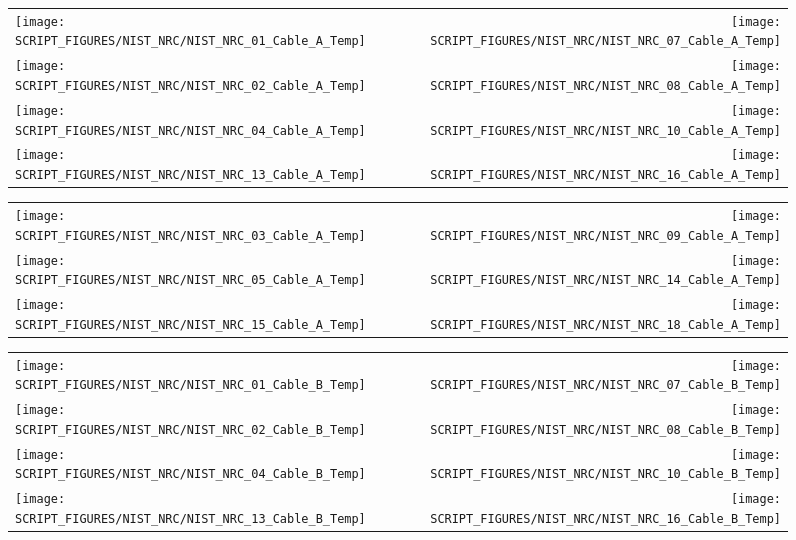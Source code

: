 \newpage

\begin{figure}[p]
\begin{tabular*}{\textwidth}{l@{\extracolsep{\fill}}r}
\texttt{[image: SCRIPT\_FIGURES/NIST\_NRC/NIST\_NRC\_01\_Cable\_A\_Temp]} &
\texttt{[image: SCRIPT\_FIGURES/NIST\_NRC/NIST\_NRC\_07\_Cable\_A\_Temp]} \\
\texttt{[image: SCRIPT\_FIGURES/NIST\_NRC/NIST\_NRC\_02\_Cable\_A\_Temp]} &
\texttt{[image: SCRIPT\_FIGURES/NIST\_NRC/NIST\_NRC\_08\_Cable\_A\_Temp]} \\
\texttt{[image: SCRIPT\_FIGURES/NIST\_NRC/NIST\_NRC\_04\_Cable\_A\_Temp]} &
\texttt{[image: SCRIPT\_FIGURES/NIST\_NRC/NIST\_NRC\_10\_Cable\_A\_Temp]} \\
\texttt{[image: SCRIPT\_FIGURES/NIST\_NRC/NIST\_NRC\_13\_Cable\_A\_Temp]} &
\texttt{[image: SCRIPT\_FIGURES/NIST\_NRC/NIST\_NRC\_16\_Cable\_A\_Temp]}
\end{tabular*}
\label{NIST_NRC_Cable_A_Closed}
\end{figure}

\begin{figure}[p]
\begin{tabular*}{\textwidth}{l@{\extracolsep{\fill}}r}
\texttt{[image: SCRIPT\_FIGURES/NIST\_NRC/NIST\_NRC\_03\_Cable\_A\_Temp]} &
\texttt{[image: SCRIPT\_FIGURES/NIST\_NRC/NIST\_NRC\_09\_Cable\_A\_Temp]} \\
\texttt{[image: SCRIPT\_FIGURES/NIST\_NRC/NIST\_NRC\_05\_Cable\_A\_Temp]} &
\texttt{[image: SCRIPT\_FIGURES/NIST\_NRC/NIST\_NRC\_14\_Cable\_A\_Temp]} \\
\texttt{[image: SCRIPT\_FIGURES/NIST\_NRC/NIST\_NRC\_15\_Cable\_A\_Temp]} &
\texttt{[image: SCRIPT\_FIGURES/NIST\_NRC/NIST\_NRC\_18\_Cable\_A\_Temp]}
\end{tabular*}
\label{NIST_NRC_Cable_A_Open}
\end{figure}

\begin{figure}[p]
\begin{tabular*}{\textwidth}{l@{\extracolsep{\fill}}r}
\texttt{[image: SCRIPT\_FIGURES/NIST\_NRC/NIST\_NRC\_01\_Cable\_B\_Temp]} &
\texttt{[image: SCRIPT\_FIGURES/NIST\_NRC/NIST\_NRC\_07\_Cable\_B\_Temp]} \\
\texttt{[image: SCRIPT\_FIGURES/NIST\_NRC/NIST\_NRC\_02\_Cable\_B\_Temp]} &
\texttt{[image: SCRIPT\_FIGURES/NIST\_NRC/NIST\_NRC\_08\_Cable\_B\_Temp]} \\
\texttt{[image: SCRIPT\_FIGURES/NIST\_NRC/NIST\_NRC\_04\_Cable\_B\_Temp]} &
\texttt{[image: SCRIPT\_FIGURES/NIST\_NRC/NIST\_NRC\_10\_Cable\_B\_Temp]} \\
\texttt{[image: SCRIPT\_FIGURES/NIST\_NRC/NIST\_NRC\_13\_Cable\_B\_Temp]} &
\texttt{[image: SCRIPT\_FIGURES/NIST\_NRC/NIST\_NRC\_16\_Cable\_B\_Temp]}
\end{tabular*}
\label{NIST_NRC_Cable_B_Closed}
\end{figure}

